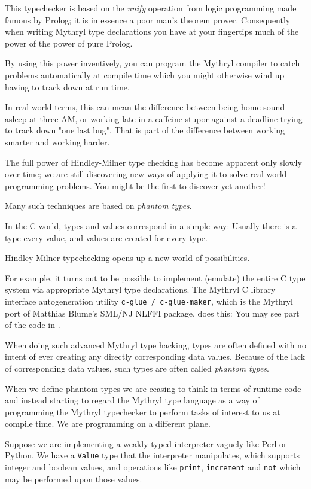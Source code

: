 This typechecker is based on the {\it unify} operation from logic 
programming made famous by Prolog; it is in essence a poor man's 
theorem prover.  Consequently when writing Mythryl type declarations 
you have at your fingertips much of the power of the power of pure 
Prolog.

By using this power inventively, you can program the Mythryl compiler 
to catch problems automatically at compile time which you might 
otherwise wind up having to track down at run time.

In real-world terms, this can mean the difference between being 
home sound asleep at three AM, or working late in a caffeine stupor 
against a deadline trying to track down "one last bug".  That is 
part of the difference between working smarter and working harder.

The full power of Hindley-Milner type checking has become apparent 
only slowly over time;  we are still discovering new ways of applying 
it to solve real-world programming problems.  You might be the first 
to discover yet another!

Many such techniques are based on {\it phantom types}.

In the C world, types and values correspond in a simple way: Usually 
there is a type every value, and values are created for every type.

Hindley-Milner typechecking opens up a new world of possibilities.

For example, it turns out to be possible to implement (emulate) the 
entire C type system via appropriate Mythryl type declarations.  The 
Mythryl C library interface autogeneration utility {\tt c-glue / 
c-glue-maker}, which is the Mythryl port of Matthias Blume's {\sc 
SML/NJ} {\sc NLFFI} package, does this: You may see part of the code 
in 
.

When doing such advanced Mythryl type hacking, types are often defined 
with no intent of ever creating any directly corresponding data values. 
Because of the lack of corresponding data values, such types are often 
called {\it phantom types}.

When we define phantom types we are ceasing to think in terms 
of runtime code and instead starting to regard the Mythryl 
type language as a way of programming the Mythryl typechecker to perform 
tasks of interest to us at compile time.  We are programming on a different 
plane.

Suppose we are implementing a weakly typed interpreter vaguely like 
Perl or Python.  We have a {\tt Value} type that the interpreter 
manipulates, which supports integer and boolean values, and operations 
like {\tt print}, {\tt increment} and {\tt not} which may be performed upon 
those values.


